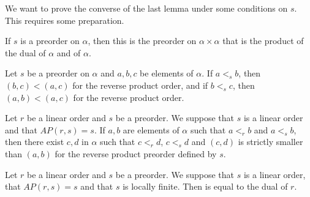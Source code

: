 We want to prove the converse of the last lemma under some conditions on $s$. This requires some preparation.

\begin{subdefi}[ReverseProductOrder]
If $s$ is a preorder on $\alpha$, then this is the preorder on $\alpha\times\alpha$ that is the product of the dual of $\alpha$ and of $\alpha$.

\end{subdefi}

\begin{sublemma}
Let $s$ be a preorder on $\alpha$ and $a,b,c$ be elements of $\alpha$. If $a<_s b$, then $(b,c)<(a,c)$ for the reverse product order, and if
$b<_s c$, then $(a,b)<(a,c)$ for the reverse product order.

\end{sublemma}

\begin{sublemma}
Let $r$ be a linear order and $s$ be a preorder. We suppose that $s$ is a linear order and that $AP(r,s)=s$. If $a,b$ are elements of $\alpha$
such that $a<_r b$ and $a<_s b$, then there exist $c,d$ in $\alpha$ such that $c<_r d$, $c<_s d$ and $(c,d)$ is strictly smaller than $(a,b)$ for
the reverse product preorder defined by $s$.

\end{sublemma}

\begin{sublemma}
Let $r$ be a linear order and $s$ be a preorder. We suppose that $s$ is a linear order, that $AP(r,s)=s$ and that $s$ is locally finite.
Then is equal to the dual of $r$.

\end{sublemma}